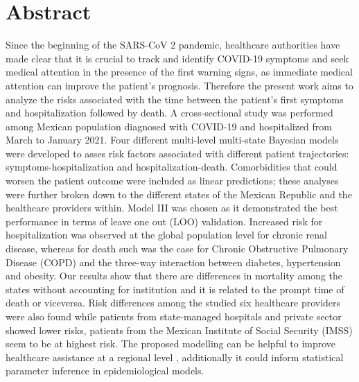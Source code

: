 \documentclass[10pt,letterpaper]{article}
\begin{document}
\section*{Abstract}
Since the beginning of the SARS-CoV 2 pandemic, healthcare authorities
have made clear that it is crucial to track and identify COVID-19
symptoms and seek medical attention in the presence of the first warning
signs, as immediate medical attention can improve the patient's
prognosis. Therefore the present work aims to analyze the risks
associated with the time between the patient's first symptoms and
hospitalization followed by death. A cross-sectional study was performed
among Mexican population diagnosed with COVID-19 and hospitalized from
March to January 2021. Four different multi-level multi-state Bayesian
models were developed to asses risk factors associated with different
patient trajectories: symptoms-hospitalization and
hospitalization-death. Comorbidities that could worsen the patient
outcome were included as linear predictions; these analyses were further
broken down to the different states of the Mexican Republic and the
healthcare providers within. Model III was chosen as it demonstrated the
best performance in terms of leave one out (LOO) validation. Increased
risk for hospitalization was observed at the global population level for
chronic renal disease, whereas for death such was the case for Chronic
Obstructive Pulmonary Disease (COPD) and the three-way interaction
between diabetes, hypertension and obesity. Our results show that there
are differences in mortality among the states without accounting for
institution and it is related to the prompt time of death or viceversa.
Risk differences among the studied six healthcare providers were also
found while patients from state-managed hospitals and private sector
showed lower risks, patients from the Mexican Institute of Social
Security (IMSS) seem to be at highest risk. The proposed modelling can
be helpful to improve healthcare assistance at a regional level ,
additionally it could inform statistical parameter inference in
epidemiological models.


\linenumbers

\newcommand{\N}{\mathbb{N}}
\newcommand{\Z}{\mathbb{Z}}
\newcommand{\R}{\mathbb{R}}
\newcommand{\Q}{\mathbb{Q}}
\newcommand{\vac}{\varnothing}
\newcommand{\Pro}{\mathbb{P}}
\newcommand{\var}{\text{Var}}
\newcommand{\E}{\mathbb{E}}
\newcommand{\ii}{\'{i}nez}
\end{document}
